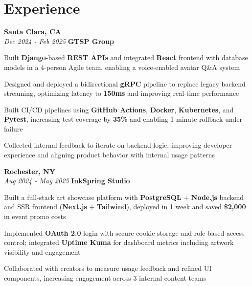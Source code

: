 \section{Experience}

\begin{twocolentry}{
    \textbf{Santa Clara, CA} \\
    \textit{Dec 2024 - Feb 2025}
}{
    \textbf{GTSP Group} \\
}
\end{twocolentry}
\begin{onecolentry}
    \begin{highlights}
        \item Built \textbf{Django}-based \textbf{REST APIs} and integrated \textbf{React} frontend with database models in a 4-person Agile team, enabling a voice-enabled avatar Q\&A system
        \item Designed and deployed a bidirectional \textbf{gRPC} pipeline to replace legacy backend streaming, optimizing latency to \textbf{150ms} and improving real-time performance
        \item Built CI/CD pipelines using \textbf{GitHub Actions}, \textbf{Docker}, \textbf{Kubernetes}, and \textbf{Pytest}, increasing test coverage by \textbf{35\%} and enabling 1-minute rollback under failure
        \item Collected internal feedback to iterate on backend logic, improving developer experience and aligning product behavior with internal usage patterns
    \end{highlights}
\end{onecolentry}

\vspace{0.2cm}

\begin{twocolentry}{
    \textbf{Rochester, NY} \\
    \textit{Aug 2024 - May 2025}
}{
    \textbf{InkSpring Studio} \\
}
\end{twocolentry}
\begin{onecolentry}
    \begin{highlights}
        \item Built a full-stack art showcase platform with \textbf{PostgreSQL} + \textbf{Node.js} backend and SSR frontend (\textbf{Next.js} + \textbf{Tailwind}), deployed in 1 week and saved \textbf{\$2,000} in event promo costs
        \item Implemented \textbf{OAuth 2.0} login with secure cookie storage and role-based access control; integrated \textbf{Uptime Kuma} for dashboard metrics including artwork visibility and engagement
        \item Collaborated with creators to measure usage feedback and refined UI components, increasing engagement across 3 internal content teams
    \end{highlights}
\end{onecolentry}

